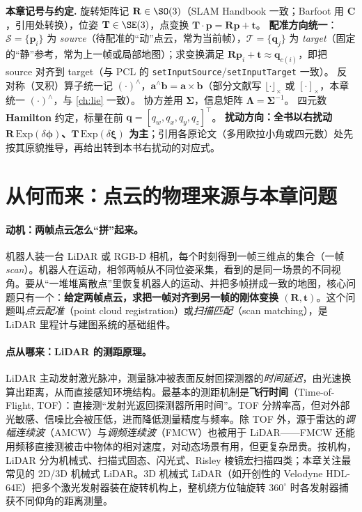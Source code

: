 \begin{note}
\textbf{本章记号与约定.}\;
旋转矩阵记 $\mathbf{R}\in\SO(3)$（SLAM Handbook\cite{carlone2026handbook} 一致；Barfoot\cite{barfoot2024state} 用 $\mathbf{C}$，引用处转换），位姿 $\mathbf{T}\in\SE(3)$，点变换 $\mathbf{T}\!\cdot\!\mathbf{p}=\mathbf{R}\mathbf{p}+\mathbf{t}$。
\textbf{配准方向统一}：$\mathcal{S}=\{\mathbf{p}_i\}$ 为 \emph{source}（待配准的“动”点云，常为当前帧），$\mathcal{T}=\{\mathbf{q}_j\}$ 为 \emph{target}（固定的“静”参考，常为上一帧或局部地图）；求变换满足 $\mathbf{R}\mathbf{p}_i+\mathbf{t}\approx\mathbf{q}_{c(i)}$，即把 source 对齐到 target（与 PCL 的 \texttt{setInputSource}/\texttt{setInputTarget} 一致）。
反对称（叉积）算子统一记 $(\cdot)^\wedge$，$\mathbf{a}^\wedge\mathbf{b}=\mathbf{a}\times\mathbf{b}$（部分文献写 $\lfloor\cdot\rfloor_\times$ 或 $[\cdot]_\times$，本章统一 $(\cdot)^\wedge$，与 \cref{ch:lie} 一致）。
协方差用 $\boldsymbol{\Sigma}$，信息矩阵 $\boldsymbol{\Lambda}=\boldsymbol{\Sigma}^{-1}$。
四元数 \textbf{Hamilton} 约定，标量在前 $\mathbf{q}=[q_w,q_x,q_y,q_z]^\top$。
\textbf{扰动方向：全书以右扰动 $\mathbf{R}\,\mathrm{Exp}(\delta\boldsymbol{\phi})$、$\mathbf{T}\,\mathrm{Exp}(\delta\boldsymbol{\xi})$ 为主}；引用各原论文（多用欧拉小角或四元数）处先按其原貌推导，再给出转到本书右扰动的对应式。
\end{note}

\section{从何而来：点云的物理来源与本章问题}
\label{sec:pc-why}

\paragraph{动机：两帧点云怎么“拼”起来。}
机器人装一台 LiDAR 或 RGB-D 相机，每个时刻得到一帧三维点的集合（一帧 \emph{scan}）。机器人在运动，相邻两帧从不同位姿采集，看到的是同一场景的不同视角。要从“一堆堆离散点”里恢复机器人的运动、并把多帧拼成一致的地图，核心问题只有一个：\textbf{给定两帧点云，求把一帧对齐到另一帧的刚体变换 $(\mathbf{R},\mathbf{t})$}。这个问题叫\emph{点云配准}（point cloud registration）或\emph{扫描匹配}（scan matching），是 LiDAR 里程计与建图系统的基础组件\cite{carlone2026handbook}。

\paragraph{点从哪来：LiDAR 的测距原理。}
LiDAR 主动发射激光脉冲，测量脉冲被表面反射回探测器的\emph{时间延迟}，由光速换算出距离，从而直接感知环境结构\cite{carlone2026handbook}。最基本的测距机制是\textbf{飞行时间}（Time-of-Flight, TOF）：直接测“发射光返回探测器所用时间”。TOF 分辨率高，但对外部光敏感、信噪比会被压低，进而降低测量精度与频率。除 TOF 外，源于雷达的\emph{调幅连续波}（AMCW）与\emph{调频连续波}（FMCW）也被用于 LiDAR——FMCW 还能用频移直接测被击中物体的相对速度，对动态场景有用，但更复杂昂贵。按机构，LiDAR 分为机械式、扫描式固态、闪光式、Risley 棱镜宏扫描四类；本章关注最常见的 2D/3D 机械式 LiDAR。3D 机械式 LiDAR（如开创性的 Velodyne HDL-64E）把多个激光发射器装在旋转机构上，整机绕方位轴旋转 $360^\circ$ 时各发射器捕获不同仰角的距离测量。

